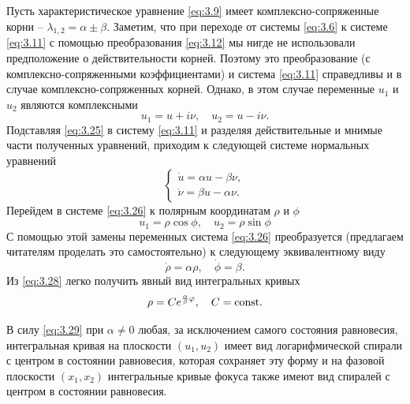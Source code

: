 Пусть характеристическое уравнение \eqref{eq:3.9}  имеет комплексно-сопряженные корни -- $\lambda_{1,2} = \alpha \pm \beta $.
Заметим, что при переходе от системы \eqref{eq:3.6} к системе \eqref{eq:3.11} с помощью преобразования \eqref{eq:3.12}  мы нигде не использовали предположение о действительности корней. Поэтому это преобразование (с комплексно-сопряженными коэффициентами) и система \eqref{eq:3.11} справедливы и в случае комплексно-сопряженных корней. Однако, в этом случае переменные $u_1$ и $u_2$ являются комплексными
\begin{equation}
        \label{eq:3.25}
        u_1 = u+i \nu, \quad u_2= u - i \nu.
\end{equation}
Подставляя \eqref{eq:3.25} в систему \eqref{eq:3.11}  и разделяя действительные и мнимые части полученных уравнений, приходим к следующей системе нормальных уравнений
\begin{equation}
        \label{eq:3.26}
        \begin{cases}
                \dot u = \alpha u -\beta \nu,\\ 
               \dot \nu = \beta u - \alpha \nu.
        \end{cases}
\end{equation}
Перейдем в системе \eqref{eq:3.26} к полярным координатам $\rho$ и $\phi$ 
\begin{equation}
        \label{eq:3.27}
        u_1= \rho \cos \phi,\quad u_2= \rho \sin \phi
\end{equation}
С помощью этой замены переменных система \eqref{eq:3.26} преобразуется (предлагаем читателям проделать это самостоятельно) к следующему эквивалентному виду
\begin{equation}
        \label{eq:3.28}
       \dot \rho = \alpha \rho, \quad \dot \phi = \beta. 
\end{equation}
Из \eqref{eq:3.28} легко получить явный вид интегральных кривых
\begin{equation}
        \label{eq:3.29}
        \rho = C e^{ \frac{\alpha}{\beta} \varphi}, \quad C=\textrm{const}.
\end{equation}


В силу \eqref{eq:3.29} при $ \alpha \neq 0$ любая, за исключением самого состояния равновесия, интегральная кривая на плоскости $( u_1, u_2)$ имеет вид логарифмической спирали с центром в состоянии равновесия, которая сохраняет эту форму и на фазовой плоскости $(x_1, x_2)$ интегральные кривые фокуса также имеют вид спиралей с центром в состоянии равновесия. 

